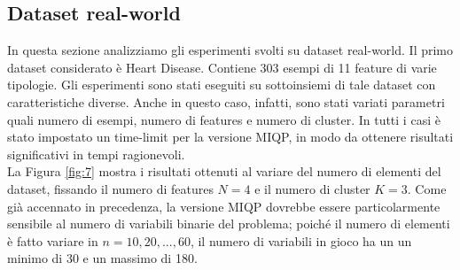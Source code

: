 \documentclass{article}
\begin{document}
    \subsection{Dataset real-world}
    In questa sezione analizziamo gli esperimenti svolti su dataset real-world. Il primo dataset considerato è Heart Disease. Contiene 303 esempi di 11 feature di varie tipologie.
    Gli esperimenti sono stati eseguiti su sottoinsiemi di tale dataset con caratteristiche diverse. Anche in questo caso, infatti, sono stati variati parametri quali numero di esempi, numero di features e numero di cluster. In tutti i casi è stato impostato un time-limit per la versione MIQP, in modo da ottenere risultati significativi in tempi ragionevoli.\\
    La Figura \ref{fig:7} mostra i risultati ottenuti al variare del numero di elementi del dataset, fissando il numero di features $N=4$ e il numero di cluster $K=3$. Come già accennato in precedenza, la versione MIQP dovrebbe essere particolarmente sensibile al numero di variabili binarie del problema; poiché il numero di elementi è fatto variare in $n=10,20,...,60$, il numero di variabili in gioco ha un un minimo di 30 e un massimo di 180.\\
\end{document}
